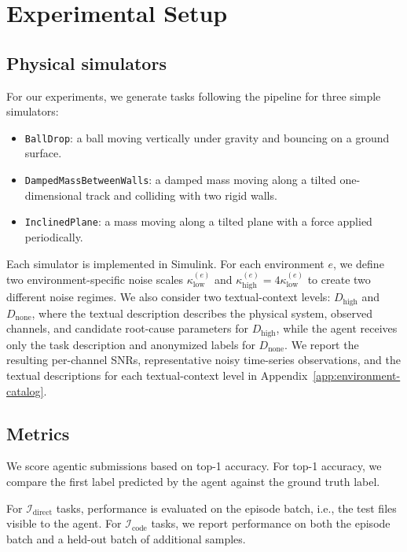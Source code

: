 \section{Experimental Setup}


\subsection{Physical simulators}
For our experiments, we generate tasks following the \name{} pipeline for three simple simulators:
\begin{itemize}[leftmargin=*,topsep=3pt,nosep]
    \item \texttt{BallDrop}: a ball moving vertically under gravity and bouncing on a ground surface.
    \item \texttt{DampedMassBetweenWalls}: a damped mass moving along a tilted one-dimensional track and colliding with two rigid walls.
    \item \texttt{InclinedPlane}: a mass moving along a tilted plane with a force applied periodically.
\end{itemize}
Each simulator is implemented in Simulink.
For each environment \(e\), we define two environment-specific noise scales  \(\kappa_{\mathrm{low}}^{(e)}\) and \(\kappa_{\mathrm{high}}^{(e)} = 4\kappa_{\mathrm{low}}^{(e)}\) to create two different noise regimes. 
We also consider two textual-context levels: \(D_{\text{high}}\) and \(D_{\text{none}}\), where the textual description describes the physical system, observed channels, and candidate root-cause parameters for \(D_{\text{high}}\), while the agent receives only the task description and anonymized labels for \(D_{\text{none}}\).
We report the resulting per-channel SNRs, representative noisy time-series observations, and the textual descriptions for each textual-context level in Appendix~\ref{app:environment-catalog}.

\subsection{Metrics}
We score agentic submissions based on top-1 accuracy.
For top-1 accuracy, we compare the first label predicted by the agent against the ground truth label.

For $\mathcal{I}_{\mathrm{direct}}$ tasks, performance is evaluated on the episode batch, i.e., the test files visible to the agent. 
For $\mathcal{I}_{\mathrm{code}}$ tasks, we report performance on both the episode batch and a held-out batch of additional samples. 

